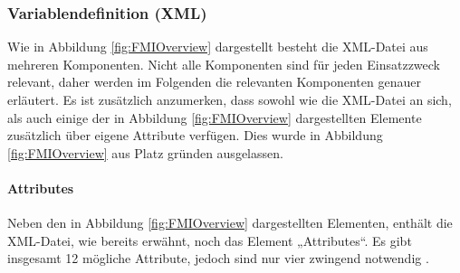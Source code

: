 \subsubsection{Variablendefinition (XML)}\label{sec:Variablendefinition}
Wie in Abbildung \ref{fig:FMIOverview} dargestellt besteht die XML-Datei aus mehreren Komponenten. Nicht alle Komponenten sind für jeden Einsatzzweck relevant, daher werden im Folgenden die relevanten Komponenten genauer erläutert.
\newline
Es ist zusätzlich anzumerken, dass sowohl wie die XML-Datei an sich, als auch einige der in Abbildung \ref{fig:FMIOverview} dargestellten Elemente zusätzlich über eigene Attribute verfügen. Dies wurde in Abbildung \ref{fig:FMIOverview} aus Platz gründen ausgelassen.

\paragraph{Attributes}\label{sec:AttributeFMU}
\noindent Neben den in Abbildung \ref{fig:FMIOverview} dargestellten Elementen, enthält die XML-Datei, wie bereits erwähnt, noch das Element „Attributes“. Es gibt insgesamt 12 mögliche Attribute, jedoch sind nur vier zwingend notwendig \cite[S.33]{25}.
